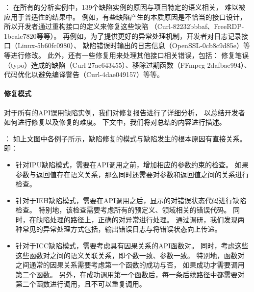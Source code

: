 
\vspace*{10pt}
\begin{center}
	\noindent{}
\end{center}

\vspace*{10pt}
：
在所有的分析实例中，139个缺陷实例的原因与项目特定的语义相关，
难以被应用于普适性的结果中。
例如，有些缺陷产生的本质原因是不恰当的接口设计，所以开发者通过重构接口的定义来修复这些缺陷
（Curl-82232bbbaf、FreeRDP-1bcale7820等等）。
再例如，为了提供更好的异常处理机制，开发者对日志记录接口（Linux-5b60fc0980）、
缺陷错误时输出的日志信息（OpenSSL-0cb8c9d85e）等等进行修改。
此外，还有一些修复用来处理其他接口相关错误，包括：
修复笔误（typo）造成的缺陷（Curl-27ac643455）、移除过期函数（FFmpeg-2dafbae994）、
代码优化以避免编译警告（Curl-4dae049157）等等。

\paragraph{修复模式}
对于所有的API误用缺陷实例，我们对修复报告进行了详细分析，
以总结开发者如何进行修复以及修复的难度。
下文中，我们将对总结的内容进行描述。

\vspace*{10pt}
{}：
如上文图中各例子所示，缺陷修复的模式与缺陷发生的根本原因有直接关系。即：
\begin{itemize}
	\item 针对IPU缺陷模式，需要在API调用之前，增加相应的参数约束的检查。
	如果参数与返回值存在语义关系，那么同时还需要对参数和返回值之间的关系进行检查。
	\item 针对于IEH缺陷模式，需要在API调用之后，显示的对错误状态代码进行缺陷检查。
	特别地，该检查需要考虑所有的预定义、领域相关的错误代码。
	同时，在缺陷处理的路径上，正确的对异常进行处理。
	通过调研，我们发现两种常见的异常处理方式包括，输出错误日志与将错误状态向上传递。
	\item 针对于ICC缺陷模式，需要考虑具有因果关系的API函数对。
	同时，考虑这些这些函数对之间的语义关联关系，即个数一致、参数一致。
	特别地，函数对之间通常的因果关系需要考虑第一个函数的成功与否，
	如果成功才需要调用第二个函数。
	另外，在成功调用第一个函数后，每一条后续路径中都需要对第二个函数进行调用，且不可以重复调用。
\end{itemize}



